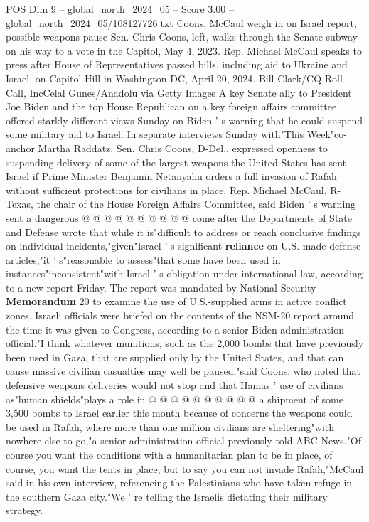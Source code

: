 \begin{textsample}{POS Dim 9 – global\_north\_2024\_05 – Score 3.00 – global\_north\_2024\_05/108127726.txt}  \label{ex:f9_pos_205}
Coons, McCaul weigh in on Israel report, possible weapons pause Sen.
Chris Coons, left, walks through the Senate subway on his way to a vote in the Capitol, May 4, 2023.
Rep.
Michael McCaul speaks to press after House of Representatives passed bills, including aid to Ukraine and Israel, on Capitol Hill in Washington DC, April 20, 2024.
Bill Clark/CQ-Roll Call, IncCelal Gunes/Anadolu via Getty Images A key Senate ally to President Joe Biden and the top House Republican on a key foreign affairs committee offered starkly different views Sunday on Biden ' s warning that he could suspend some military aid to Israel.
In separate interviews Sunday with"This Week"co-anchor Martha Raddatz, Sen.
Chris Coons, D-Del., expressed openness to suspending delivery of some of the largest weapons the United States has sent Israel if Prime Minister Benjamin Netanyahu orders a full invasion of Rafah without sufficient protections for civilians in place.
Rep.
Michael McCaul, R-Texas, the chair of the House Foreign Affairs Committee, said Biden ' s warning sent a dangerous @ @ @ @ @ @ @ @ @ @ come after the Departments of State and Defense wrote that while it is"difficult to address or reach conclusive findings on individual incidents,"given"Israel ' s significant \textbf{reliance} on U.S.-made defense articles,"it ' s"reasonable to assess"that some have been used in instances"inconsistent"with Israel ' s obligation under international law, according to a new report Friday.
The report was mandated by National Security \textbf{Memorandum} 20 to examine the use of U.S.-supplied arms in active conflict zones.
Israeli officials were briefed on the contents of the NSM-20 report around the time it was given to Congress, according to a senior Biden administration official."I think whatever munitions, such as the 2,000 bombs that have previously been used in Gaza, that are supplied only by the United States, and that can cause massive civilian casualties may well be paused,"said Coons, who noted that defensive weapons deliveries would not stop and that Hamas ' use of civilians as"human shields"plays a role in @ @ @ @ @ @ @ @ @ @ a shipment of some 3,500 bombs to Israel earlier this month because of concerns the weapons could be used in Rafah, where more than one million civilians are sheltering"with nowhere else to go,"a senior administration official previously told ABC News."Of course you want the conditions with a humanitarian plan to be in place, of course, you want the tents in place, but to say you can not invade Rafah,"McCaul said in his own interview, referencing the Palestinians who have taken refuge in the southern Gaza city."We ' re telling the Israelis dictating their military strategy.

\end{textsample}
